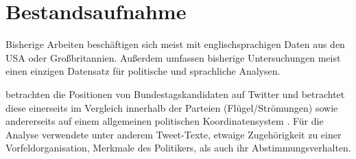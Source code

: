 




\section{Bestandsaufnahme}

Bisherige Arbeiten beschäftigen sich meist mit englischsprachigen Daten aus den USA oder Großbritannien. Außerdem umfassen bisherige Untersuchungen meist einen einzigen Datensatz für politische und sprachliche Analysen.

\textcite{saltzer_bundestagswahl_2022} betrachten die Positionen von Bundestagskandidaten auf Twitter und betrachtet diese einerseits im Vergleich innerhalb der Parteien (Flügel/Strömungen) sowie andererseits auf einem allgemeinen politischen Koordinatensystem \autocite{saltzer_bundestagswahl_2022, saltzer_finding_2022}. Für die Analyse verwendete \textcite{saltzer_finding_2022} unter anderem Tweet-Texte, etwaige Zugehörigkeit zu einer Vorfeldorganisation, Merkmale des Politikers, als auch ihr Abstimmungsverhalten.

